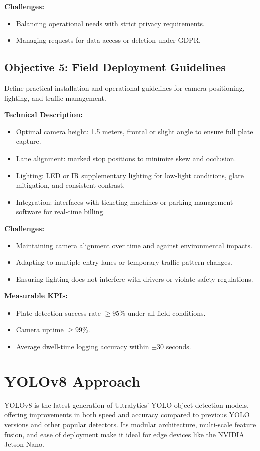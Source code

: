 	\textbf{Challenges:}  
	\begin{itemize}
		\item Balancing operational needs with strict privacy requirements.
		\item Managing requests for data access or deletion under GDPR.
	\end{itemize}
	
	\subsection{Objective 5: Field Deployment Guidelines}
	Define practical installation and operational guidelines for camera positioning, lighting, and traffic management.
	
	\textbf{Technical Description:}  
	\begin{itemize}
		\item Optimal camera height: 1.5 meters, frontal or slight angle to ensure full plate capture.
		\item Lane alignment: marked stop positions to minimize skew and occlusion.
		\item Lighting: LED or IR supplementary lighting for low-light conditions, glare mitigation, and consistent contrast.
		\item Integration: interfaces with ticketing machines or parking management software for real-time billing.
	\end{itemize}
	
	\textbf{Challenges:}  
	\begin{itemize}
		\item Maintaining camera alignment over time and against environmental impacts.
		\item Adapting to multiple entry lanes or temporary traffic pattern changes.
		\item Ensuring lighting does not interfere with drivers or violate safety regulations.
	\end{itemize}
	
	\textbf{Measurable KPIs:}  
	\begin{itemize}
		\item Plate detection success rate $\geq 95\%$ under all field conditions.
		\item Camera uptime $\geq 99\%$.
		\item Average dwell-time logging accuracy within $\pm 30$ seconds.
	\end{itemize}
	
	\section{YOLOv8 Approach}
	YOLOv8 is the latest generation of Ultralytics' YOLO object detection models, offering improvements in both speed and accuracy compared to previous YOLO versions and other popular detectors. Its modular architecture, multi-scale feature fusion, and ease of deployment make it ideal for edge devices like the NVIDIA Jetson Nano.
